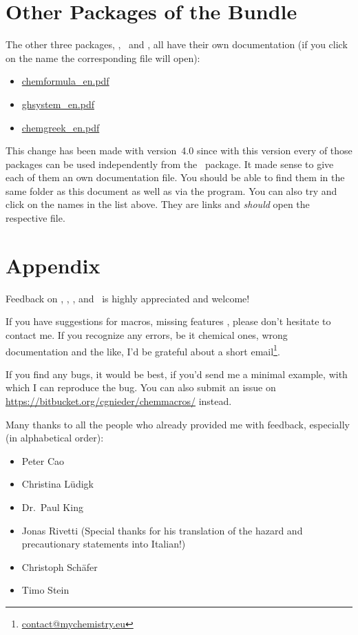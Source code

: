 \documentclass[load-preamble+]{cnltx-doc}
\begin{document}
\part{Other Packages of the Bundle}

The other three packages, \chemformula, \ghsystem\ and \chemgreek, all have
their own documentation (if you click on the name the corresponding file will
open):
\begin{itemize}
  \item \url{chemformula_en.pdf}
  \item \url{ghsystem_en.pdf}
  \item \url{chemgreek_en.pdf}
\end{itemize}

This change has been made with version~4.0 since with this
version every of those packages can be used independently from the
\chemmacros\ package.  It made sense to give each of them an own documentation
file.  You should be able to find them in the same folder as this document as
well as via the  program.  You can also try and click on the
names in the list above.  They are links and \emph{should} open the respective
file.

\appendix
\part{Appendix}

Feedback on \chemmacros, \chemformula, \chemgreek, and \ghsystem\ is highly
appreciated and welcome!

If you have suggestions for macros, missing features \etc, please don't
hesitate to contact me.  If you recognize any errors, be it chemical ones,
wrong documentation and the like, I'd be grateful about a short
email\footnote{\href{mailto:contact@mychemistry.eu}{contact@mychemistry.eu}}.

If you find any bugs, it would be best, if you'd send me a minimal example,
with which I can reproduce the bug.  You can also submit an issue on
\url{https://bitbucket.org/cgnieder/chemmacros/} instead.

Many thanks to all the people who already provided me with feedback,
especially (in alphabetical order):
\begin{itemize}
  \item Peter Cao
  \item Christina Lüdigk
  \item Dr.~Paul King
  \item Jonas Rivetti (Special thanks for his translation of the hazard and
    precautionary statements into Italian!)
  \item Christoph Schäfer
  \item Timo Stein
\end{itemize}
\end{document}
